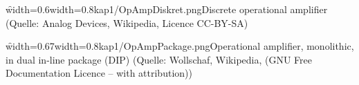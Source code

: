 \begin{frame}
{    %
    \begin{minipage}[t]{0.5\textwidth}
        \f{width=0.6\textwidth}{width=0.8\textwidth}{kap1/OpAmpDiskret.png}{Discrete operational amplifier {\tiny(Quelle: Analog Devices, Wikipedia, Licence CC-BY-SA)}} %
    \end{minipage}    
    \begin{minipage}[t]{0.5\textwidth}
        \f{width=0.67\textwidth}{width=0.8\textwidth}{kap1/OpAmpPackage.png}{Operational amplifier, monolithic, in dual in-line package (DIP) {\tiny(Quelle: Wollschaf, Wikipedia, (GNU Free Documentation Licence – with attribution))}} %
    \end{minipage}  
%        
        
    }


\end{frame}
